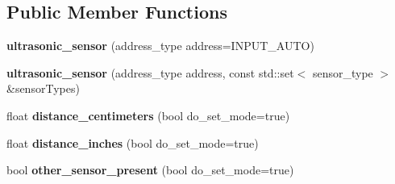 \subsection*{Public Member Functions}
\begin{DoxyCompactItemize}
\item 
\mbox{\label{classev3dev_1_1ultrasonic__sensor_a65250933ac2690da427fd1736795f613}} 
{\bfseries ultrasonic\+\_\+sensor} (address\+\_\+type address=I\+N\+P\+U\+T\+\_\+\+A\+U\+TO)
\item 
\mbox{\label{classev3dev_1_1ultrasonic__sensor_a42d0f8b2995ff7bfee06eecc6cbd3ed4}} 
{\bfseries ultrasonic\+\_\+sensor} (address\+\_\+type address, const std\+::set$<$ sensor\+\_\+type $>$ \&sensor\+Types)
\item 
\mbox{\label{classev3dev_1_1ultrasonic__sensor_a33f848199b9218cb3cfedecb81850b8c}} 
float {\bfseries distance\+\_\+centimeters} (bool do\+\_\+set\+\_\+mode=true)
\item 
\mbox{\label{classev3dev_1_1ultrasonic__sensor_a1f8eee162c8f9f3ad921f8d61ad8b2de}} 
float {\bfseries distance\+\_\+inches} (bool do\+\_\+set\+\_\+mode=true)
\item 
\mbox{\label{classev3dev_1_1ultrasonic__sensor_a77609a0b10680057b184292ab0bb3d78}} 
bool {\bfseries other\+\_\+sensor\+\_\+present} (bool do\+\_\+set\+\_\+mode=true)
\end{DoxyCompactItemize}
